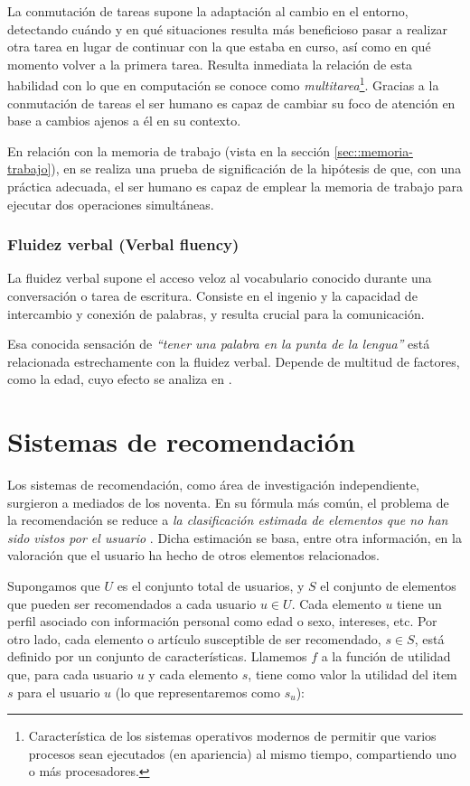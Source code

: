 La conmutación de tareas supone la adaptación al cambio en el entorno, detectando cuándo y en qué situaciones resulta más beneficioso pasar a realizar otra tarea en lugar de continuar con la que estaba en curso, así como en qué momento volver a la primera tarea. Resulta inmediata la relación de esta habilidad con lo que en computación se conoce como {\it multitarea}\footnote{Característica de los sistemas operativos modernos de permitir que varios procesos sean ejecutados (en apariencia) al mismo tiempo, compartiendo uno o más procesadores.}. Gracias a la conmutación de tareas el ser humano es capaz de cambiar su foco de atención en base a cambios ajenos a él en su contexto.

En relación con la memoria de trabajo (vista en la sección \ref{sec::memoria-trabajo}), en \cite{Klaus2004} se realiza una prueba de significación de la hipótesis de que, con una práctica adecuada, el ser humano es capaz de emplear la memoria de trabajo para ejecutar dos operaciones simultáneas.

\subsubsection{Fluidez verbal (Verbal fluency)}

La fluidez verbal supone el acceso veloz al vocabulario conocido durante una conversación o tarea de escritura. Consiste en el ingenio y la capacidad de intercambio y conexión de palabras, y resulta crucial para la comunicación.

Esa conocida sensación de {\it ``tener una palabra en la punta de la lengua''} está relacionada estrechamente con la fluidez verbal. Depende de multitud de factores, como la edad, cuyo efecto se analiza en \cite{Deborah2004}.

\section{Sistemas de recomendación}
\label{sec::sistemas-recomendacion}

Los sistemas de recomendación, como área de investigación independiente, surgieron a mediados de los noventa. En su fórmula más común, el problema de la recomendación se reduce a {\it la clasificación estimada de elementos que no han sido vistos por el usuario} \cite{adomavicius}. Dicha estimación se basa, entre otra información, en la valoración que el usuario ha hecho de otros elementos relacionados.

Supongamos que $U$ es el conjunto total de usuarios, y $S$ el conjunto de elementos que pueden ser recomendados a cada usuario $u \in U$. Cada elemento $u$ tiene un perfil asociado con información personal como edad o sexo, intereses, etc. Por otro lado, cada elemento o artículo susceptible de ser recomendado, $s \in S$, está definido por un conjunto de características. Llamemos $f$ a la función de utilidad que, para cada usuario $u$ y cada elemento $s$, tiene como valor la utilidad del item $s$ para el usuario $u$ (lo que representaremos como $s_u$):

